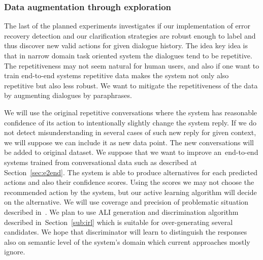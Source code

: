 \documentclass[11pt]{article}
\begin{document}
\subsubsection*{Data augmentation through exploration}
The last of the planned experiments investigates if our implementation of error recovery detection and our clarification strategies are robust enough to label and thus discover new valid actions for given dialogue history.
The idea key idea is that in narrow domain task oriented system the dialogues tend to be repetitive.
The repetitiveness may not seem natural for human users, and also if one want to train end-to-end systems repetitive data makes the system not only also repetitive but also less robust. 
We want to mitigate the repetitiveness of the data by augmenting dialogues by paraphrases.

We will use the original repetitive conversations where the system has reasonable confidence of its action to intentionally slightly change the system reply.
If we do not detect misunderstanding in several cases of such new reply for given context, we will suppose we can include it as new data point. 
The new conversations will be added to original dataset.
We suppose that we want to improve an~end-to-end systems trained from conversational data such as described at Section~\ref{sec:e2end}.
The system is able to produce alternatives for each predicted actions and also their confidence scores.
Using the scores we may not choose the recommended action by the system, but our active learning algorithm will decide on the alternative.
We will use coverage and precision of problematic situation described in~\cite{meena_datadriven_2016}.
We plan to use ALI generation and discrimination algorithm described in~Section~\ref{sub:irl} which is suitable for over-generating several candidates.
We hope that discriminator will learn to distinguish the responses also on semantic level of the system's domain which current approaches mostly ignore. 
\end{document}
